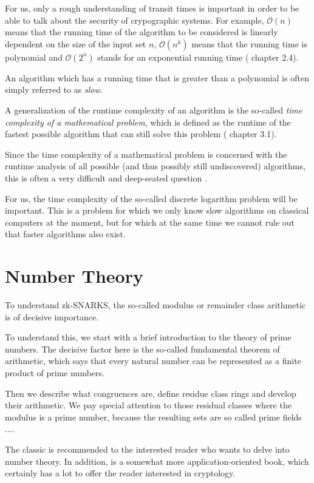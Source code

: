 For us, only a rough understanding of transit times is important in order to be able to talk about the security of crypographic systems. For example, $\mathcal{O}(n)$ means that the running time of the algorithm to be considered is linearly dependent on the size of the input set $n$, $\mathcal{O}(n^k)$ means that the running time is polynomial and $\mathcal{O}(2^n) $ stands for an exponential running time (%
chapter 2.4).


An algorithm which has a running time that is greater than a polynomial is often simply referred to as \textit{slow}.

A generalization of the runtime complexity of an algorithm is the so-called \textit{time complexity of a mathematical problem}, which is defined as the runtime of the fastest possible algorithm that can still solve this problem (
chapter 3.1).

Since the time complexity of a mathematical problem is concerned with the runtime analysis of all possible (and thus possibly still undiscovered) algorithms, this is often a very difficult and deep-seated question .

For us, the time complexity of the so-called discrete logarithm problem will be important. This is a problem for which we only know slow algorithms on classical computers at the moment, but for which at the same time we cannot rule out that faster algorithms also exist.

\section{Number Theory}
To understand zk-SNARKS, the so-called modulus or remainder class arithmetic is of decisive importance.

To understand this, we start with a brief introduction to the theory of prime numbers. The decisive factor here is the so-called fundamental theorem of arithmetic, which says that every natural number can be represented as a finite product of prime numbers.

Then we describe what congruences are, define residue class rings and develop their arithmetic. We pay special attention to those residual classes where the modulus is a prime number, because the resulting sets are so called prime fields ....
 
The classic \cite{HW} is recommended to the interested reader who wants to delve into number theory. In addition, \cite{FO} is a somewhat more application-oriented book, which certainly has a lot to offer the reader interested in cryptology.
 

